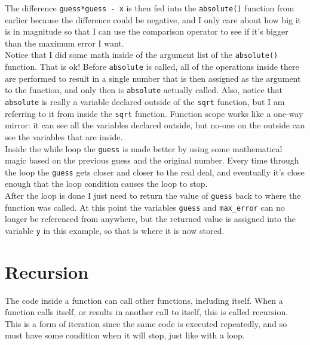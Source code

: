 The difference \texttt{guess*guess - x} is then fed into the \texttt{absolute()} function from earlier because the difference could be negative, and I only care about how big it is in magnitude so that I can use the comparison operator to see if it's bigger than the maximum error I want.\\

Notice that I did some math inside of the argument list of the \texttt{absolute()} function. That is ok! Before \texttt{absolute} is called, all of the operations inside there are performed to result in a single number that is then assigned as the argument to the function, and only then is \texttt{absolute} actually called. Also, notice that \texttt{absolute} is really a variable declared outside of the \texttt{sqrt} function, but I am referring to it from inside the \texttt{sqrt} function. Function scope works like a one-way mirror: it can see all the variables declared outside, but no-one on the outside can see the variables that are inside.\\

Inside the while loop the \texttt{guess} is made better by using some mathematical magic based on the previous guess and the original number. Every time through the loop the \texttt{guess} gets closer and closer to the real deal, and eventually it's close enough that the loop condition causes the loop to stop.\\

After the loop is done I just need to return the value of \texttt{guess} back to where the function was called. At this point the variables \texttt{guess} and \texttt{max\_error} can no longer be referenced from anywhere, but the returned value is assigned into the variable \texttt{y} in this example, so that is where it is now stored.\\

\section{Recursion}


The code inside a function can call other functions, including itself. When a function calls itself, or results in another call to itself, this is called recursion. This is a form of iteration since the same code is executed repeatedly, and so must have some condition when it will stop, just like with a loop.\\



